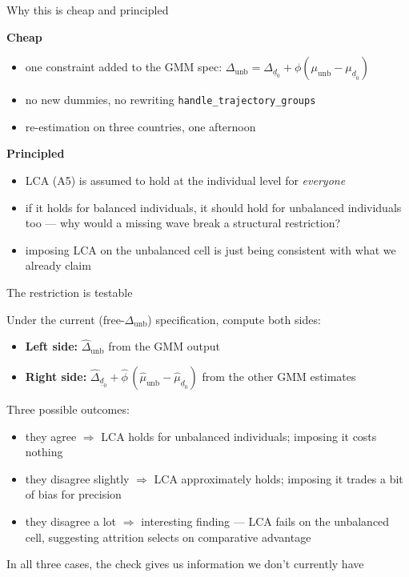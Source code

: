 \documentclass[10pt,aspectratio=169]{beamer}
\newcommand{\mudz}{\mu_{\underline{d}_0}}
\newcommand{\munb}{\mu_{\mathrm{unb}}}
\newcommand{\Deltadz}{\Delta_{\underline{d}_0}}
\newcommand{\Deltaunb}{\Delta_{\mathrm{unb}}}
\begin{document}
\begin{frame}{Why this is cheap and principled}

  \textbf{Cheap}
  \begin{itemize}
    \item one constraint added to the GMM spec: $\Deltaunb = \Deltadz + \phi(\munb - \mudz)$
    \item no new dummies, no rewriting \texttt{handle\_trajectory\_groups}
    \item re-estimation on three countries, one afternoon
  \end{itemize}

  \vspace{0.8em}
  \textbf{Principled}
  \begin{itemize}
    \item LCA (A5) is assumed to hold at the individual level for \emph{everyone}
    \item if it holds for balanced individuals, it should hold for unbalanced individuals too --- why would a missing wave break a structural restriction?
    \item imposing LCA on the unbalanced cell is just being consistent with what we already claim
  \end{itemize}

\end{frame}

\begin{frame}{The restriction is testable}

  Under the current (free-$\Deltaunb$) specification, compute both sides:

  \vspace{0.8em}
  \begin{itemize}
    \item \textbf{Left side:} $\hat\Deltaunb$ from the GMM output
    \item \textbf{Right side:} $\hat\Deltadz + \hat\phi\,(\hat\munb - \hat\mudz)$ from the other GMM estimates
  \end{itemize}

  \vspace{0.8em}
  Three possible outcomes:

  \vspace{0.3em}
  \begin{itemize}
    \item \alert{they agree} $\Rightarrow$ LCA holds for unbalanced individuals; imposing it costs nothing
    \item \alert{they disagree slightly} $\Rightarrow$ LCA approximately holds; imposing it trades a bit of bias for precision
    \item \alert{they disagree a lot} $\Rightarrow$ interesting finding --- LCA fails on the unbalanced cell, suggesting attrition selects on comparative advantage
  \end{itemize}

  \vspace{0.6em}
  In all three cases, the check gives us information we don't currently have

\end{frame}
\end{document}
